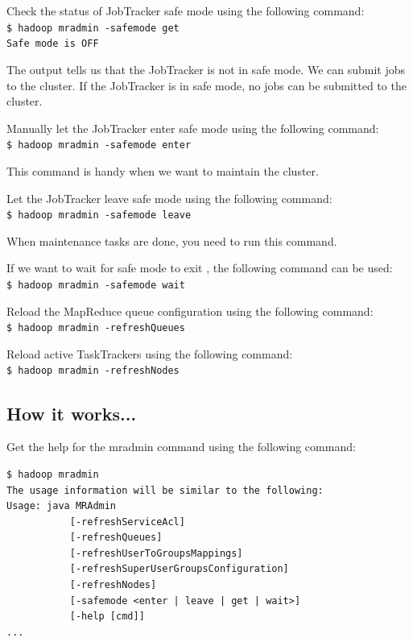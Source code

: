 Check the status of JobTracker safe mode using the following command: \\
\verb|$ hadoop mradmin -safemode get| \\
\verb|Safe mode is OFF|

The output tells us that the JobTracker is not in safe mode. We can submit jobs to the cluster. If the JobTracker is in safe mode, no jobs can be submitted to the cluster.

Manually let the JobTracker enter safe mode using the following command: \\
\verb|$ hadoop mradmin -safemode enter|

This command is handy when we want to maintain the cluster.

Let the JobTracker leave safe mode using the following command: \\
\verb|$ hadoop mradmin -safemode leave|

\begin{warning} When maintenance tasks are done, you need to run this command.\end{warning}

If we want to wait for safe mode to exit , the following command can be used: \\
\verb|$ hadoop mradmin -safemode wait|

Reload the MapReduce queue configuration using the following command: \\
\verb|$ hadoop mradmin -refreshQueues|

Reload active TaskTrackers using the following command:\\
\verb|$ hadoop mradmin -refreshNodes|

\subsection*{How it works...}
Get the help for the mradmin command using the following command:
\begin{verbatim}
$ hadoop mradmin
The usage information will be similar to the following:
Usage: java MRAdmin
           [-refreshServiceAcl]
           [-refreshQueues]
           [-refreshUserToGroupsMappings]
           [-refreshSuperUserGroupsConfiguration]
           [-refreshNodes]
           [-safemode <enter | leave | get | wait>]
           [-help [cmd]]
...
\end{verbatim}

